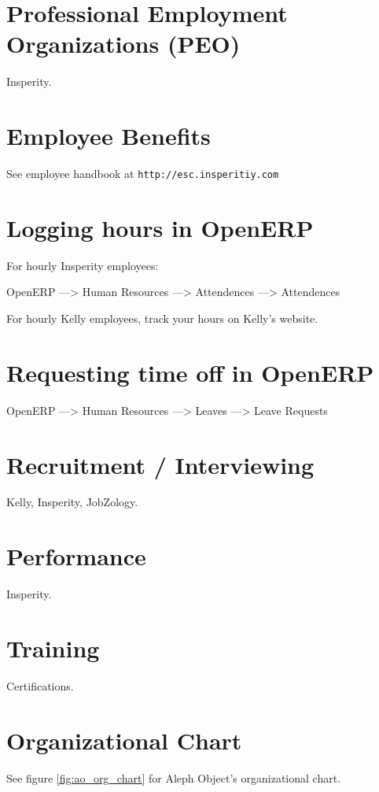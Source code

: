 %
%
%
%
%



\section{Professional Employment Organizations (PEO)}
Insperity.

\section{Employee Benefits}
See employee handbook at \texttt{http://esc.insperitiy.com}

\section{Logging hours in OpenERP}
For hourly Insperity employees:

OpenERP ---> Human Resources ---> Attendences ---> Attendences

For hourly Kelly employees, track your hours on Kelly's website.

\section{Requesting time off in OpenERP}
OpenERP ---> Human Resources ---> Leaves ---> Leave Requests

\section{Recruitment / Interviewing}
Kelly, Insperity, JobZology.

\section{Performance}
Insperity.

\section{Training}
Certifications.

\section{Organizational Chart}
See figure \ref{fig:ao_org_chart} for Aleph Object's organizational chart.


